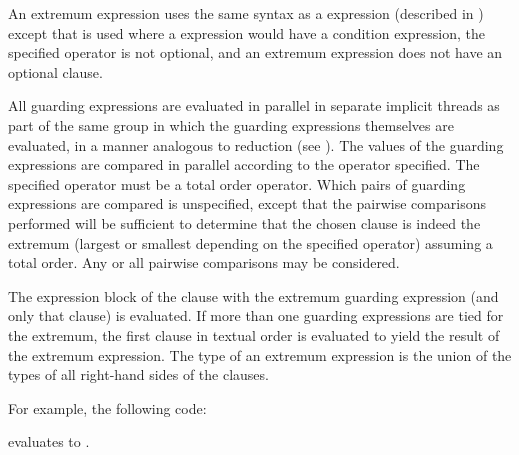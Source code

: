 An extremum expression uses the same syntax as a  expression
(described in ) except that  is used
where a  expression would have a condition expression,
the specified operator is not optional,
and an extremum expression does not have an optional  clause.

All guarding expressions are evaluated in parallel in separate implicit threads
as part of the same group in which the guarding expressions themselves
are evaluated, in a manner analogous to reduction (see ).
The values of the guarding expressions are
compared in parallel according to the operator specified.
The specified operator must be a total order operator.
Which pairs of guarding expressions are
compared is unspecified, except that the pairwise comparisons
performed will be sufficient to determine that the chosen clause is
indeed the extremum (largest or smallest depending on the specified operator)
assuming a total order.  Any or all pairwise comparisons may be considered.


The expression block of the clause with the extremum
guarding expression (and only that clause) is evaluated.  If more than
one guarding expressions are tied for the extremum, the first
clause in textual order is evaluated to yield the result of the
extremum expression.  The type of an extremum expression is the union
of the types of all right-hand sides of the clauses.

For example, the following code:

evaluates to .
